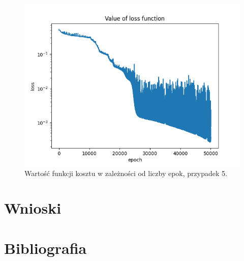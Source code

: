 \documentclass[11pt, leqno]{scrartcl}
\begin{document}
    \begin{figure}[H]
        \centering
        \includegraphics[width=0.7\linewidth]{nn_c_loss.png}
        \caption{Wartość funkcji kosztu w zależności od liczby epok,
            przypadek 5.}
    \end{figure}

    \section{Wnioski}
    \section{Bibliografia}
\end{document}
